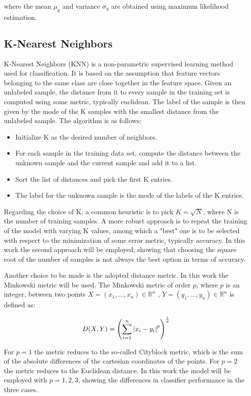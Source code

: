 \documentclass[journal,twocolumn]{IEEEtran}
\begin{document}
where the mean $\mu_y$ and variance $\sigma_y$ are obtained using maximum likelihood estimation.

\subsection{K-Nearest Neighbors}

K-Nearest Neighbors (KNN) is a non-parametric supervised learning method used for classification. It is based on the assumption that feature vectors belonging to the same class are close
together in the feature space. Given an unlabeled sample,
the distance from it to every sample in the training set is
computed using some metric, typically euclidean. The label
of the sample is then given by the mode of the K samples
with the smallest distance from the unlabeled sample. The
algorithm is as follows:
\begin{itemize}
\item Initialize K as the desired number of neighbors.
\item For each sample in the training data set, compute the
distance between the unknown sample and the current
sample and add it to a list.
\item Sort the list of distances and pick the first K entries.
\item The label for the unknown sample is the mode of the
labels of the K entries.
\end{itemize}
Regarding
the choice of K, a common heuristic is to pick $K=\sqrt{N}$, where N is the number of training samples. A more robust approach is to repeat the training of the model
with varying K values, among which a "best" one is to be
selected with respect to the minimization of some error metric, typically accuracy. In this work the second approach will be employed, showing that choosing the square root of the number of samples is not always the best option in terms of accuracy.

Another choice to be made is the adopted distance metric. In
this work the Minkowski metric will be used. The Minkowski
metric of order $p$, where $p$ is an integer, between two points $X=(x_1,\dots,x_n)\in\mathbb{R}^n$ , $Y=(y_1,\dots,y_n) \in\mathbb{R}^n$ is defined
as:

\begin{equation*}
D(X,Y)=\left(\sum\limits_{i=1}^n\abs{x_i-y_i}^p\right)^{\frac{1}{p}}
\end{equation*}

For $p=1$ the metric reduces to the so-called Cityblock metric, which is the sum of the absolute differences of the cartesian coordinates of the points. For $p=2$ the metric reduces to the Euclidean distance. In this work the model will be employed with $p=1,2,3$, showing the differences in classifier performance in the three cases.
\end{document}
